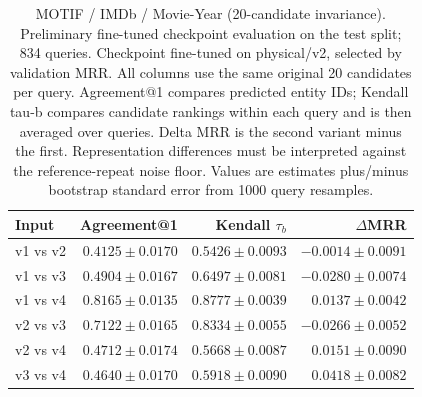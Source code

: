 \begin{table}[t]
\centering
\small
\begin{tabular}{lrrr}
\toprule
Input & Agreement@1 & Kendall $\tau_b$ & $\Delta$MRR \\
\midrule
v1 vs v2 & $0.4125 \pm 0.0170$ & $0.5426 \pm 0.0093$ & $-0.0014 \pm 0.0091$ \\
v1 vs v3 & $0.4904 \pm 0.0167$ & $0.6497 \pm 0.0081$ & $-0.0280 \pm 0.0074$ \\
v1 vs v4 & $0.8165 \pm 0.0135$ & $0.8777 \pm 0.0039$ & $0.0137 \pm 0.0042$ \\
v2 vs v3 & $0.7122 \pm 0.0165$ & $0.8334 \pm 0.0055$ & $-0.0266 \pm 0.0052$ \\
v2 vs v4 & $0.4712 \pm 0.0174$ & $0.5668 \pm 0.0087$ & $0.0151 \pm 0.0090$ \\
v3 vs v4 & $0.4640 \pm 0.0170$ & $0.5918 \pm 0.0090$ & $0.0418 \pm 0.0082$ \\
\bottomrule
\end{tabular}
\caption{MOTIF / IMDb / Movie-Year (20-candidate invariance). Preliminary fine-tuned checkpoint evaluation on the test split; 834 queries. Checkpoint fine-tuned on physical/v2, selected by validation MRR. All columns use the same original 20 candidates per query. Agreement@1 compares predicted entity IDs; Kendall tau-b compares candidate rankings within each query and is then averaged over queries. Delta MRR is the second variant minus the first. Representation differences must be interpreted against the reference-repeat noise floor. Values are estimates plus/minus bootstrap standard error from 1000 query resamples.}
\label{tab:motif-movie_year-invariance}
\end{table}
